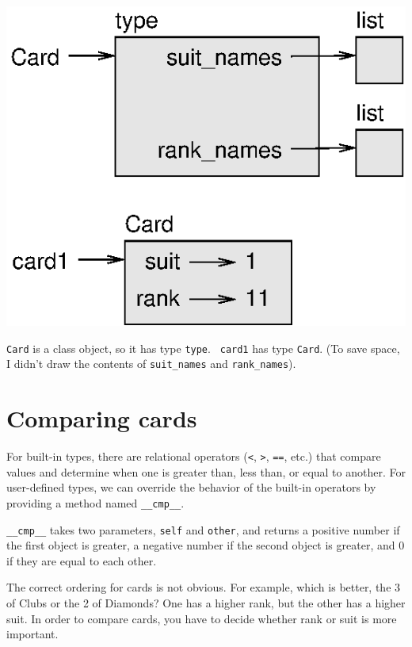 
\beforefig
\centerline{\includegraphics{figs/card1.eps}}
\afterfig

{\tt Card} is a class object, so it has type {\tt type}.  {\tt
card1} has type {\tt Card}.  (To save space, I didn't draw the
contents of \verb"suit_names" and \verb"rank_names").


\section{Comparing cards}
\label{comparecard}


For built-in types, there are relational operators
({\tt <}, {\tt >}, {\tt ==}, etc.)
that compare
values and determine when one is greater than, less than, or equal to
another.  For user-defined types, we can override the behavior of
the built-in operators by providing a method named
\verb"__cmp__".  

\verb"__cmp__" takes two parameters, {\tt self} and {\tt other},
and returns a positive number if the first object is greater, a
negative number if the second object is greater, and 0 if they are
equal to each other.


The correct ordering for cards is not obvious.
For example, which
is better, the 3 of Clubs or the 2 of Diamonds?  One has a higher
rank, but the other has a higher suit.  In order to compare
cards, you have to decide whether rank or suit is more important.

